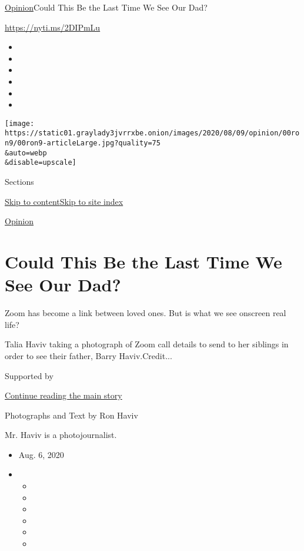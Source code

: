 \href{/section/opinion}{Opinion}\textbar{}Could This Be the Last Time We
See Our Dad?

\href{https://nyti.ms/2DIPmLu}{https://nyti.ms/2DIPmLu}

\begin{itemize}
\item
\item
\item
\item
\item
\item
\end{itemize}

\texttt{[image: https://static01.graylady3jvrrxbe.onion/images/2020/08/09/opinion/00ron9/00ron9-articleLarge.jpg?quality=75\\\&auto=webp\\\&disable=upscale]}

Sections

\protect\hyperlink{site-content}{Skip to
content}\protect\hyperlink{site-index}{Skip to site index}

\href{/section/opinion}{Opinion}

\hypertarget{could-this-be-the-last-time-we-see-our-dad}{%
\section{Could This Be the Last Time We See Our
Dad?}\label{could-this-be-the-last-time-we-see-our-dad}}

Zoom has become a link between loved ones. But is what we see onscreen
real life?

Talia Haviv taking a photograph of Zoom call details to send to her
siblings in order to see their father, Barry Haviv.Credit...

Supported by

\protect\hyperlink{after-sponsor}{Continue reading the main story}

Photographs and Text by Ron Haviv

Mr. Haviv is a photojournalist.

\begin{itemize}
\item
  Aug. 6, 2020
\item
  \begin{itemize}
  \item
  \item
  \item
  \item
  \item
  \item
  \end{itemize}
\end{itemize}

